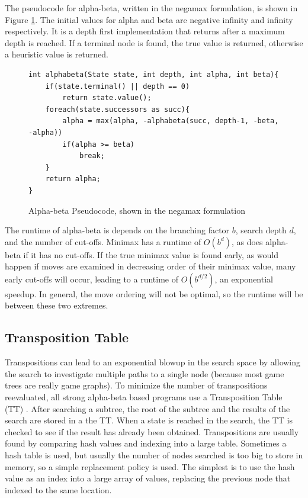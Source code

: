The pseudocode for alpha-beta, written in the negamax formulation, is shown in Figure \ref{fig:abcode}. The initial values for alpha and beta are negative infinity and infinity respectively. It is a depth first implementation that returns after a maximum depth is reached. If a terminal node is found, the true value is returned, otherwise a heuristic value is returned.

\begin{figure}

\begin{lstlisting}
int alphabeta(State state, int depth, int alpha, int beta){
	if(state.terminal() || depth == 0)
		return state.value();
	foreach(state.successors as succ){
		alpha = max(alpha, -alphabeta(succ, depth-1, -beta, -alpha))
		if(alpha >= beta)
			break;
	}
	return alpha;
}
\end{lstlisting}

\caption{Alpha-beta Pseudocode, shown in the negamax formulation}
\label{fig:abcode}
\end{figure}

The runtime of alpha-beta is depends on the branching factor $b$, search depth $d$, and the number of cut-offs. Minimax has a runtime of $O(b^d)$, as does alpha-beta if it has no cut-offs. If the true minimax value is found early, as would happen if moves are examined in decreasing order of their minimax value, many early cut-offs will occur, leading to a runtime of $O(b^{d/2})$, an exponential speedup. In general, the move ordering will not be optimal, so the runtime will be between these two extremes.

\subsection{Transposition Table}

Transpositions can lead to an exponential blowup in the search space by allowing the search to investigate multiple paths to a single node (because most game trees are really game graphs). To minimize the number of transpositions reevaluated, all strong alpha-beta based programs use a Transposition Table (TT) \cite{slate1977chess}. After searching a subtree, the root of the subtree and the results of the search are stored in a the TT. When a state is reached in the search, the TT is checked to see if the result has already been obtained. Transpositions are usually found by comparing hash values and indexing into a large table. Sometimes a hash table is used, but usually the number of nodes searched is too big to store in memory, so a simple replacement policy is used. The simplest is to use the hash value as an index into a large array of values, replacing the previous node that indexed to the same location.

